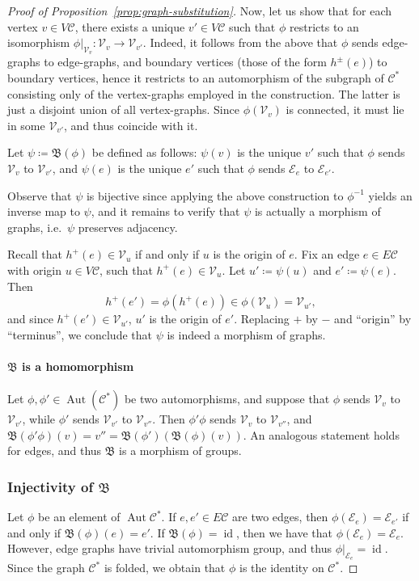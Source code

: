 \documentclass[10pt,a4paper]{amsart}
\newcommand{\ie}{i.e.\ }
\theoremstyle{definition}
\newcommand{\cC}{\mathcal{C}}
\newcommand{\cV}{\mathcal{V}}
\newcommand{\cE}{\mathcal{E}}
\DeclareMathOperator{\aut}{Aut}
\DeclareMathOperator{\id}{id}
\newcommand{\Con}{\mathfrak{B}}
\begin{document}
\begin{proof}[Proof of Proposition~\ref{prop:graph-substitution}]
Now, let us show that for each vertex $v\in V\cC$, there exists a unique $v'\in V\cC$ such that ${\phi}$ restricts to an isomorphism ${\phi}|_{\cV_v}:\cV_v \to \cV_{v'}$. Indeed, it follows from the above that ${\phi}$ sends edge-graphs to edge-graphs, and boundary vertices (those of the form $h^{\pm}(e)$) to boundary vertices, hence it restricts to an automorphism of the subgraph of $\cC^*$ consisting only of the vertex-graphs employed in the construction. The latter is just a disjoint union of all vertex-graphs. Since ${\phi}(\cV_v)$ is connected, it must lie in some $\cV_{v'}$, and thus coincide with it.
 
Let $ {\psi} \coloneqq \Con({\phi})$ be defined as follows: ${\psi}(v)$ is the unique $v'$ such that ${\phi}$ sends $\cV_v$ to $\cV_{v'}$, and ${\psi}(e)$ is the unique $e'$ such that ${\phi}$ sends $\cE_e$ to $\cE_{e'}$.

Observe that ${\psi}$ is bijective since applying the above construction to ${\phi}^{-1}$ yields an inverse map to ${\psi}$, and it remains to verify that ${\psi}$ is actually a morphism of graphs, \ie $\psi$ preserves adjacency.

Recall that $h^{+}(e)\in \cV_u$ if and only if $u$ is the origin of $e$. Fix an edge $e\in E\cC$ with origin $u\in V\cC$, such that $h^{+}(e)\in \cV_u$. Let $u'\coloneqq {\psi}(u)$ and $e'\coloneqq {\psi}(e)$. Then
\[
h^{+}(e') = {\phi}(h^{+}(e)) \in {\phi}(\cV_u) = \cV_{u'},
\]
and since $h^{+}(e')\in \cV_{u'}$, $u'$ is the origin of $e'$. Replacing $+$ by $-$ and ``origin'' by ``terminus'', we conclude that ${\psi}$ is indeed a morphism of graphs.


\paragraph{$\Con$ is a homomorphism} Let ${\phi}, {\phi}'\in \aut(\cC^*)$ be two automorphisms, and suppose that ${\phi}$ sends $\cV_v$ to $\cV_{v'}$, while ${\phi}'$ sends $\cV_{v'}$ to $\cV_{v''}$. Then ${\phi}'{\phi}$ sends $\cV_{v}$ to $\cV_{v''}$, and $\Con({\phi}'{\phi})(v) = v'' = \Con({\phi}')(\Con({\phi})(v))$.
An analogous statement holds for edges, and thus $\Con$ is a morphism of groups.


\subsubsection*{Injectivity of $\Con$} Let $\phi$ be an element of $\aut \cC^{*}$. If $e, e' \in E \cC$ are two edges, then $\phi(\cE_e)=\cE_{e'}$ if and only if $\Con (\phi )(e)=e'$. If $\Con(\phi) = \id $, then we have that $\phi(\cE_e)=\cE_{e}$. However, edge graphs have trivial automorphism group, and thus $\phi|_{\cE_e}=\id $. Since the graph $\cC^*$ is folded, we obtain that $\phi$ is the identity on $\cC^*$.


\end{proof}
\end{document}
